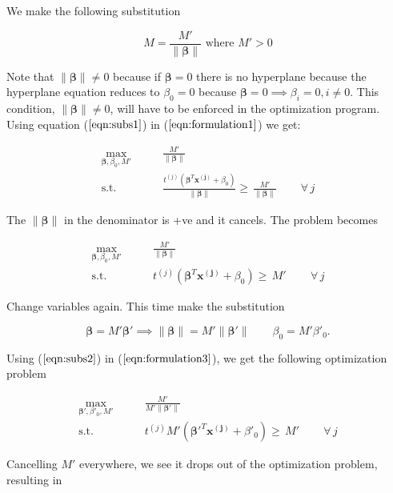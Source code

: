 \documentclass{article}
\newcommand{\beq}{\begin{equation}}
\newcommand{\eeq}{\end{equation}}
\begin{document}
We make the following substitution

\beq
\label{eqn:subs1}
M = \frac{M'}{\|\pmb{\beta}\|}  \text{ where } M' > 0
\eeq 

Note that $\|\pmb{\beta}\|\ne{0}$ because if $\pmb{\beta}=0$ there is no hyperplane because the hyperplane equation reduces to $\beta_0=0$ because  $\pmb{\beta}=0 \implies {\beta_i}=0, i\ne{0}$. This condition, $\|\pmb{\beta}\|\ne{0}$, will have to be enforced in the optimization program.\\

Using equation ($\ref{eqn:subs1}$) in ($\ref{eqn:formulation1}$) we get:

\beq
\label{eqn:formulation2}
\begin{aligned}
  \max_{\pmb{\beta},\beta_0,M'} &  \qquad \frac{M'}{\|\pmb{\beta}\|} \\
  \textrm{s.t.} & \qquad \frac{t^{(j)}(\pmb{\beta}^T{\pmb{x^{(j)}}} + \beta_0)}{\|\pmb{\beta}\|} \ge\, \frac{M'}{\|\pmb{\beta}\|}  \, \qquad \forall \,{j}
\end{aligned}
\eeq

The $\|\pmb{\beta}\|$ in the denominator is +ve and it cancels. The problem becomes

\beq
\label{eqn:formulation3}
\begin{aligned}
  \max_{\pmb{\beta},\beta_0,M'} &  \qquad \frac{M'}{\|\pmb{\beta}\|} \\
  \textrm{s.t.} & \qquad {t^{(j)}(\pmb{\beta}^T{\pmb{x^{(j)}}} + \beta_0)} \ge\, {M'}  \, \qquad \forall \,{j}
\end{aligned}
\eeq

Change variables again. This time make the substitution

\beq
\label{eqn:subs2}
\pmb{\beta} = M'\pmb{\beta}' \implies \|\pmb{\beta}\| = M'\|\pmb{\beta}'\|    \qquad \beta_0 = M'\beta'_0. 
\eeq

Using ($\ref{eqn:subs2}$) in ($\ref{eqn:formulation3}$), we get the following optimization problem

\beq
\label{eqn:formulation4}
\begin{aligned}
  \max_{\pmb{\beta}',\beta'_0,M'} &  \qquad \frac{M'}{M'\|\pmb{\beta}'\|} \\
  \textrm{s.t.} & \qquad {t^{(j)}M'({\pmb{\beta}'}^T{\pmb{x^{(j)}}} + \beta'_0)} \ge\, {M'}  \, \qquad \forall \,{j}
\end{aligned}
\eeq

Cancelling $M'$ everywhere, we see it drops out of the optimization problem, resulting in
\end{document}
